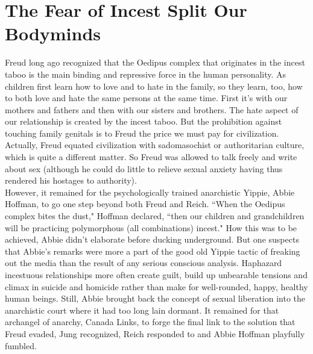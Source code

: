 \section*{The Fear of Incest Split Our Bodyminds}
Freud long ago recognized that the Oedipus complex that originates in the incest taboo is the main binding and repressive force in the human personality. As children  first learn how to love and to hate in the family, so they learn, too, how to both love and hate the same persons at the same time. First it's with our mothers and fathers and then with our sisters and brothers. The hate aspect of our relationship is created by the incest taboo. But the prohibition against touching family genitals is to Freud the price we must pay for civilization. Actually, Freud equated civilization with sadomasochist or authoritarian culture, which is quite a different matter. So Freud was allowed to talk freely and write about sex (although he could do little to relieve sexual anxiety having thus rendered his hostages to authority).\\
However, it remained for the psychologically trained anarchistic Yippie, Abbie Hoffman, to go one step beyond both Freud and Reich. ``When the Oedipus complex bites the dust," Hoffman declared, ``then our children and grandchildren will be practicing polymorphous (all combinations) incest." How this was to be achieved, Abbie didn't elaborate before ducking underground. But one suspects that Abbie's remarks were more a part of the good old Yippie tactic of freaking out the media than the result of any serious conscious analysis. Haphazard incestuous relationships more often create guilt, build up unbearable tensions and climax in suicide and homicide rather than make for well-rounded, happy, healthy human beings. Still, Abbie brought back the concept of sexual liberation into the anarchistic court where it had too long lain dormant. It remained for that archangel of anarchy, Canada Links, to forge the final link to the solution that Freud evaded, Jung recognized, Reich responded to and Abbie Hoffman playfully fumbled.

